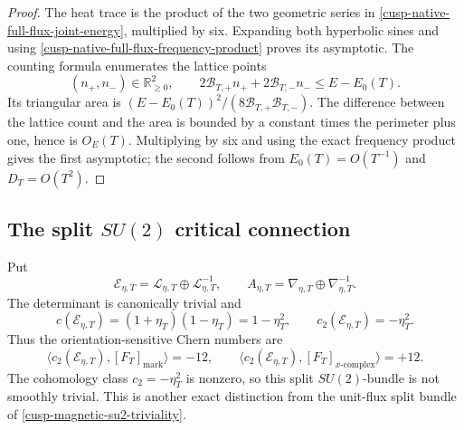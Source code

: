 \begin{proof}
The heat trace is the product of the two geometric series in
\cref{cusp-native-full-flux-joint-energy}, multiplied by six.  Expanding both
hyperbolic sines and using
\cref{cusp-native-full-flux-frequency-product} proves its asymptotic.
The counting formula enumerates the lattice points
\[
 (n_+,n_-)\in\mathbb R_{\ge0}^2,
 \qquad
 2\mathcal B_{T,+}n_++2\mathcal B_{T,-}n_-
 \le E-E_0(T).
\]
Its triangular area is
\((E-E_0(T))^2/(8\mathcal B_{T,+}\mathcal B_{T,-})\).  The difference
between the lattice count and the area is bounded by a constant times the
perimeter plus one, hence is \(O_E(T)\).  Multiplying by six and using the
exact frequency product gives the first asymptotic; the second follows from
\(E_0(T)=O(T^{-1})\) and \(D_T=O(T^2)\).
\end{proof}

\subsection{The split \texorpdfstring{\(SU(2)\)}{SU(2)} critical connection}

Put
\begin{equation}
 \mathscr E_{\eta,T}=\mathscr L_{\eta,T}\oplus
 \mathscr L_{\eta,T}^{-1},
 \qquad
 A_{\eta,T}=\nabla_{\eta,T}\oplus\nabla_{\eta,T}^{-1}.
 \label{cusp-native-full-flux-split-bundle-connection}
\end{equation}
The determinant is canonically trivial and
\begin{equation}
 c(\mathscr E_{\eta,T})=(1+\eta_T)(1-\eta_T)=1-\eta_T^2,
 \qquad c_2(\mathscr E_{\eta,T})=-\eta_T^2.
 \label{cusp-native-full-flux-Chern-class}
\end{equation}
Thus the orientation-sensitive Chern numbers are
\begin{equation}
 \langle c_2(\mathscr E_{\eta,T}),[F_T]_{\mathrm{mark}}\rangle=-12,
 \qquad
 \langle c_2(\mathscr E_{\eta,T}),
 [F_T]_{x\text{-}\mathrm{complex}}\rangle=+12.
 \label{cusp-native-full-flux-Chern-numbers}
\end{equation}
The cohomology class \(c_2=-\eta_T^2\) is nonzero, so this split
\(SU(2)\)-bundle is not smoothly trivial.  This is another exact distinction
from the unit-flux split bundle of \cref{cusp-magnetic-su2-triviality}.

